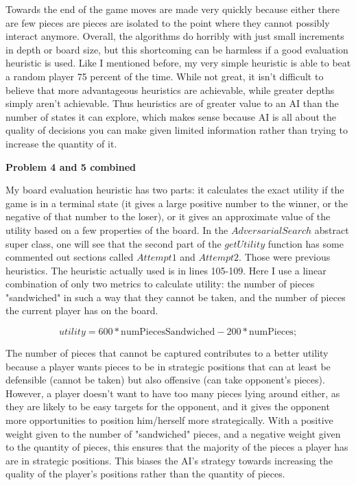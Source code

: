 \documentclass[12pt]{article}
\makeatletter
\newcommand{\exercise}[1]{\par\vspace{4ex}\normalfont\normalsize\noindent
\textbf{\large Problem #1}\par\nobreak\@afterindentfalse\@afterheading\vspace{.75ex}}
\makeatother
\begin{document}
Towards the end of the game moves are made very quickly because either there are few pieces are pieces are isolated to the point where they cannot possibly interact anymore. Overall, the algorithms do horribly with just small increments in depth or board size, but this shortcoming can be harmless if a good evaluation heuristic is used. Like I mentioned before, my very simple heuristic is able to beat a random player 75 percent of the time. While not great, it isn't difficult to believe that more advantageous heuristics are achievable, while greater depths simply aren't achievable. Thus heuristics are of greater value to an AI than the number of states it can explore, which makes sense because AI is all about the quality of decisions you can make given limited information rather than trying to increase the quantity of it. 



 
\exercise{4 and 5 combined}

My board evaluation heuristic has two parts: it calculates the exact utility if the game is in a terminal state (it gives a large positive number to the winner, or the negative of that number to the loser), or it gives an approximate value of the utility based on a few properties of the board. In the $AdversarialSearch$ abstract super class, one will see that the second part of the $getUtility$ function has some commented out sections called $Attempt 1$ and $Attempt 2$. Those were previous heuristics. The heuristic actually used is in lines 105-109. Here I use a linear combination of only two metrics to calculate utility: the number of pieces "sandwiched" in such a way that they cannot be taken, and the number of pieces the current player has on the board. 

\begin{equation*}
utility = 600*\text{numPiecesSandwiched} - 200*\text{numPieces};
\end{equation*}

The number of pieces that cannot be captured contributes to a better utility because a player wants pieces to be in strategic positions that can at least be defensible (cannot be taken) but also offensive (can take opponent's pieces). However, a player doesn't want to have too many pieces lying around either, as they are likely to be easy targets for the opponent, and it gives the opponent more opportunities to position him/herself more strategically. With a positive weight given to the number of "sandwiched" pieces, and a negative weight given to the quantity of pieces, this ensures that the majority of the pieces a player has are in strategic positions. This biases the AI's strategy towards increasing the quality of the player's positions rather than the quantity of pieces. 
\end{document}
